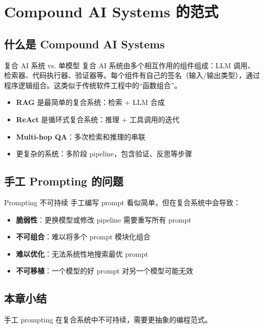 \section{Compound AI Systems 的范式}

\subsection{什么是 Compound AI Systems}

\begin{knowledgebox}{复合 AI 系统 vs. 单模型}
复合 AI 系统由多个相互作用的组件组成：LLM 调用、检索器、代码执行器、验证器等。每个组件有自己的签名（输入/输出类型），通过程序逻辑组合。这类似于传统软件工程中的``函数组合''。
\end{knowledgebox}

\begin{itemize}
    \item \textbf{RAG} 是最简单的复合系统：检索 + LLM 合成
    \item \textbf{ReAct} 是循环式复合系统：推理 + 工具调用的迭代
    \item \textbf{Multi-hop QA}：多次检索和推理的串联
    \item 更复杂的系统：多阶段 pipeline，包含验证、反思等步骤
\end{itemize}

\subsection{手工 Prompting 的问题}

\begin{warningbox}{Prompting 不可持续}
手工编写 prompt 看似简单，但在复合系统中会导致：
\begin{itemize}
    \item \textbf{脆弱性}：更换模型或修改 pipeline 需要重写所有 prompt
    \item \textbf{不可组合}：难以将多个 prompt 模块化组合
    \item \textbf{难以优化}：无法系统性地搜索最优 prompt
    \item \textbf{不可移植}：一个模型的好 prompt 对另一个模型可能无效
\end{itemize}
\end{warningbox}

\subsection{本章小结}

手工 prompting 在复合系统中不可持续，需要更抽象的编程范式。

